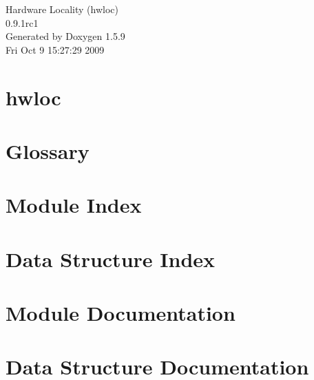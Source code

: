 \documentclass[letterpaper]{book}
\begin{document}
\hypersetup{pageanchor=false}
\begin{titlepage}
\vspace*{7cm}
\begin{center}
{\Large Hardware Locality (hwloc) \\[1ex]\large 0.9.1rc1 }\\
\vspace*{1cm}
{\large Generated by Doxygen 1.5.9}\\
\vspace*{0.5cm}
{\small Fri Oct 9 15:27:29 2009}\\
\end{center}
\end{titlepage}
\clearemptydoublepage
{}
\tableofcontents
\clearemptydoublepage
{}
\hypersetup{pageanchor=true}
\chapter{hwloc}
\label{index}\hypertarget{index}{}
\chapter{Glossary}
\label{glossary}
\hypertarget{glossary}{}

\chapter{Module Index}

\chapter{Data Structure Index}

\chapter{Module Documentation}






















\chapter{Data Structure Documentation}






\printindex
\end{document}
